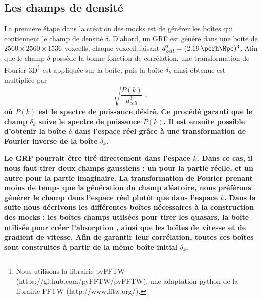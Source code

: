 \documentclass[11pt, twoside, a4paper, openright]{report}
\begin{document}
\subsection{Les champs de densité}
\label{subsec:densityfields}
La première étape dans la création des mocks est de générer les boîtes qui contiennent le champ de densité $\delta$. D'abord, un GRF est généré dans une boite de $\num{2560}\times\num{2560}\times\num{1536}$ voxcells, chaque voxcell faisant  $d_{cell}^3 = (\SI{2.19}{\perh\Mpc})^3$.
Afin que le champ $\delta$ possède la bonne fonction de corrélation, une transformation de Fourier 3D\footnote{Nous utilisons la librairie pyFFTW (https://github.com/pyFFTW/pyFFTW), une adaptation python de la librairie FFTW (http://www.fftw.org/).} est appliquée sur la boîte, puis la boîte $\delta_k$ ainsi obtenue est multipliée par
\begin{equation}
  \sqrt{\frac{P(k)}{d_{cell}^3}} \; ,
\end{equation}
\textbf{où $P(k)$ est le spectre de puissance désiré. Ce procédé garanti que le champ $\delta_k$ suive le spectre de puissance $P(k)$. Il est ensuite possible d'obtenir la boîte $\delta$ dans l'espace réel grâce à une transformation de Fourier inverse de la boîte $\delta_k$.}

\textbf{Le GRF pourrait être tiré directement dans l'espace $k$. Dans ce cas, il nous faut tirer deux champs gaussiens : un pour la partie réelle, et un autre pour la partie imaginaire. La transformation de Fourier prenant moins de temps que la génération du champ aléatoire, nous préférons générer le champ dans l'espace réel plutôt que dans l'espace $k$.
Dans la suite nous décrivons les différentes boîtes nécessaires à la construction des mocks : les boîtes champs utilsées pour tirer les quasars, la boîte utilisée pour créer l'absorption \lya{}, ainsi que les boîtes de vitesse et de gradient de vitesse. Afin de garantir leur corrélation, toutes ces boîtes sont construites à partir de la même boîte initial $\delta_k$.}
\end{document}
